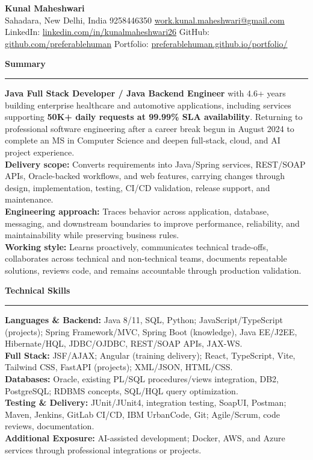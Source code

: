 \documentclass[11pt,letterpaper]{article}
\newcommand{\ressection}[1]{\Needspace{5\baselineskip}\vspace{8pt}\par\textbf{#1}\par\vspace{2pt}\hrule\vspace{5pt}}
\begin{document}
\pagestyle{empty}\raggedright\fontsize{11}{12.5}\selectfont

{\Large \textbf{Kunal Maheshwari}}\\
Sahadara, New Delhi, India \textbar{} 9258446350 \textbar{} \href{mailto:work.kunal.maheshwari@gmail.com}{work.kunal.maheshwari@gmail.com}\\
LinkedIn: \href{https://www.linkedin.com/in/kunalmaheshwari26}{linkedin.com/in/kunalmaheshwari26} \textbar{} GitHub: \href{https://github.com/preferablehuman}{github.com/preferablehuman} \textbar{} Portfolio: \href{https://preferablehuman.github.io/portfolio/}{preferablehuman.github.io/portfolio/}

\ressection{Summary}
\textbf{Java Full Stack Developer / Java Backend Engineer} with 4.6+ years building enterprise healthcare and automotive applications, including services supporting \textbf{50K+ daily requests at 99.99\% SLA availability}. Returning to professional software engineering after a career break begun in August 2024 to complete an MS in Computer Science and deepen full-stack, cloud, and AI project experience.\\[2pt]
\textbf{Delivery scope:} Converts requirements into Java/Spring services, REST/SOAP APIs, Oracle-backed workflows, and web features, carrying changes through design, implementation, testing, CI/CD validation, release support, and maintenance.\\[2pt]
\textbf{Engineering approach:} Traces behavior across application, database, messaging, and downstream boundaries to improve performance, reliability, and maintainability while preserving business rules.\\[2pt]
\textbf{Working style:} Learns proactively, communicates technical trade-offs, collaborates across technical and non-technical teams, documents repeatable solutions, reviews code, and remains accountable through production validation.

\ressection{Technical Skills}
\textbf{Languages \& Backend:} Java 8/11, SQL, Python; JavaScript/TypeScript (projects); Spring Framework/MVC, Spring Boot (knowledge), Java EE/J2EE, Hibernate/HQL, JDBC/OJDBC, REST/SOAP APIs, JAX-WS.\\
\textbf{Full Stack:} JSF/AJAX; Angular (training delivery); React, TypeScript, Vite, Tailwind CSS, FastAPI (projects); XML/JSON, HTML/CSS.\\
\textbf{Databases:} Oracle, existing PL/SQL procedures/views integration, DB2, PostgreSQL; RDBMS concepts, SQL/HQL query optimization.\\
\textbf{Testing \& Delivery:} JUnit/JUnit4, integration testing, SoapUI, Postman; Maven, Jenkins, GitLab CI/CD, IBM UrbanCode, Git; Agile/Scrum, code reviews, documentation.\\
\textbf{Additional Exposure:} AI-assisted development; Docker, AWS, and Azure services through professional integrations or projects.
\end{document}
